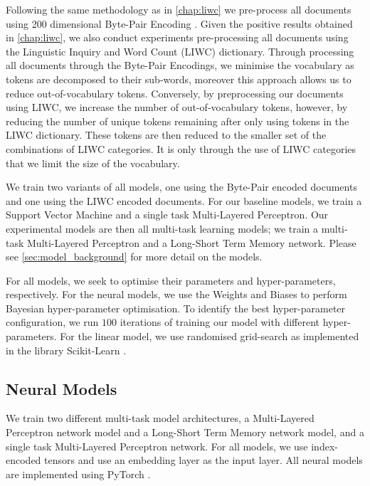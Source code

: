Following the same methodology as in \autoref{chap:liwc} we pre-process all documents using 200 dimensional Byte-Pair Encoding \cite{Heinzerling:2018}. Given the positive results obtained in \autoref{chap:liwc}, we also conduct experiments pre-processing all documents using the Linguistic Inquiry and Word Count (LIWC) dictionary. Through processing all documents through the Byte-Pair Encodings, we minimise the vocabulary as tokens are decomposed to their sub-words, moreover this approach allows us to reduce out-of-vocabulary tokens. Conversely, by preprocessing our documents using LIWC, we increase the number of out-of-vocabulary tokens, however, by reducing the number of unique tokens remaining after only using tokens in the LIWC dictionary. These tokens are then reduced to the smaller set of the combinations of LIWC categories. It is only through the use of LIWC categories that we limit the size of the vocabulary.\vspace{5mm}

We train two variants of all models, one using the Byte-Pair encoded documents and one using the LIWC encoded documents. For our baseline models, we train a Support Vector Machine and a single task Multi-Layered Perceptron. Our experimental models are then all multi-task learning models; we train a multi-task Multi-Layered Perceptron and a Long-Short Term Memory network. Please see \autoref{sec:model_background} for more detail on the models.

For all models, we seek to optimise their parameters and hyper-parameters, respectively. For the neural models, we use the Weights and Biases \cite{Wandb} to perform Bayesian hyper-parameter optimisation. To identify the best hyper-parameter configuration, we run $100$ iterations of training our model with different hyper-parameters. For the linear model, we use randomised grid-search as implemented in the library Scikit-Learn \cite{Pedregosa:2011}.

\subsection{Neural Models}

We train two different multi-task model architectures, a Multi-Layered Perceptron network model and a Long-Short Term Memory network model, and a single task Multi-Layered Perceptron network. For all models, we use index-encoded tensors and use an embedding layer as the input layer. All neural models are implemented using PyTorch \cite{Paszke:2019}.

